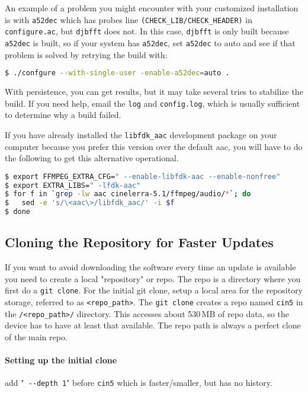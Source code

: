An example of a problem you might encounter with your customized installation is with \texttt{a52dec} which has probes line \texttt{(CHECK\_LIB/CHECK\_HEADER)} in \texttt{configure.ac}, but \texttt{djbfft} does not.  
In this case, \texttt{djbfft} is only built because \texttt{a52dec} is built, so if your system has \texttt{a52dec}, set \texttt{a52dec} to auto and see if that problem is solved by retrying the build with:  
\begin{lstlisting}[language=bash,numbers=none]
$ ./confgure --with-single-user -enable-a52dec=auto .
\end{lstlisting}

With persistence, you can get results, but it may take several tries to stabilize the build.  
If you need help, email the \texttt{log} and \texttt{config.log}, which is usually sufficient to determine why a build failed.

If you have already installed the \texttt{libfdk\_aac} development package on your computer because you prefer this version over the default aac, you will have to do the following to get this alternative operational.

\begin{lstlisting}[language=bash,numbers=none]
$ export FFMPEG_EXTRA_CFG=" --enable-libfdk-aac --enable-nonfree"
$ export EXTRA_LIBS=" -lfdk-aac"
$ for f in `grep -lw aac cinelerra-5.1/ffmpeg/audio/*`; do
$   sed -e 's/\<aac\>/libfdk_aac/' -i $f
$ done
\end{lstlisting}

\subsection{Cloning the Repository for Faster Updates}%
\label{sub:cloning_the_repository_for_faster_updates}

If you want to avoid downloading the software every time an update is available you need to create a local "repository" or repo.  
The repo is a directory where you first do a \texttt{git clone}.  
For the initial git clone, setup a local area for the repository storage, referred to as \texttt{<repo\_path>}.  
The \texttt{git clone} creates a repo named \texttt{cin5} in the \texttt{/<repo\_path>/} directory.  
This accesses about 530\,MB of repo data, so the device has to have at least that available.  
The repo path is always a perfect clone of the main repo.

\paragraph{Setting up the initial clone}%
\label{par:setting_up_the_initial_clone}
add "\texttt{ -{}-depth 1}" before \texttt{cin5} which is faster/smaller, but has no history.

